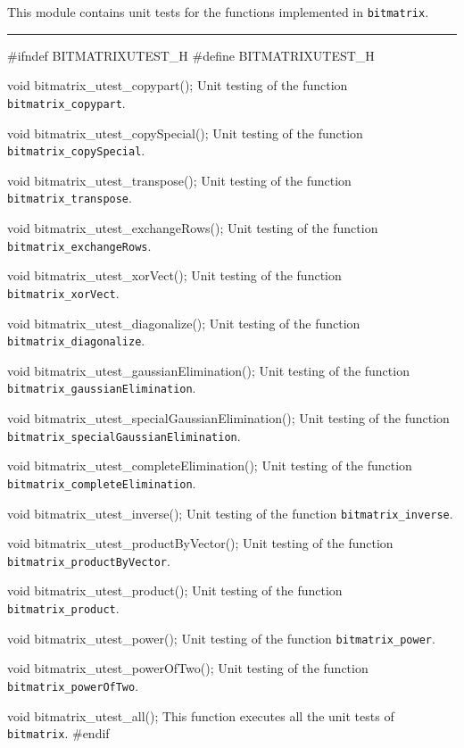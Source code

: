 
This module contains unit tests for the functions implemented in {\tt bitmatrix}. 

\bigskip
\hrule
\code
\hide
#ifndef BITMATRIXUTEST_H
#define BITMATRIXUTEST_H
\endhide
\endcode

\code
void bitmatrix_utest_copypart();
\endcode
 \tab  Unit testing of the function {\tt bitmatrix\_copypart}.
 \endtab
\code

void bitmatrix_utest_copySpecial();
\endcode
 \tab  Unit testing of the function {\tt bitmatrix\_copySpecial}.
 \endtab
\code

void bitmatrix_utest_transpose();
\endcode
 \tab  Unit testing of the function {\tt bitmatrix\_transpose}.
 \endtab
\code

void bitmatrix_utest_exchangeRows();
\endcode
 \tab  Unit testing of the function {\tt bitmatrix\_exchangeRows}.
 \endtab
\code

void bitmatrix_utest_xorVect();
\endcode
 \tab  Unit testing of the function {\tt bitmatrix\_xorVect}.
 \endtab
\code

void bitmatrix_utest_diagonalize();
\endcode
 \tab  Unit testing of the function {\tt bitmatrix\_diagonalize}.
 \endtab
\code

void bitmatrix_utest_gaussianElimination();
\endcode
 \tab  Unit testing of the function {\tt bitmatrix\_gaussianElimination}.
 \endtab
\code

void bitmatrix_utest_specialGaussianElimination();
\endcode
 \tab  Unit testing of the function {\tt bitmatrix\_specialGaussianElimination}.
 \endtab
\code

void bitmatrix_utest_completeElimination();
\endcode
 \tab  Unit testing of the function {\tt bitmatrix\_completeElimination}.
 \endtab
\code

void bitmatrix_utest_inverse();
\endcode
 \tab  Unit testing of the function {\tt bitmatrix\_inverse}.
 \endtab
\code

void bitmatrix_utest_productByVector();
\endcode
 \tab  Unit testing of the function {\tt bitmatrix\_productByVector}.
 \endtab
\code

void bitmatrix_utest_product();
\endcode
 \tab  Unit testing of the function {\tt bitmatrix\_product}.
 \endtab
\code

void bitmatrix_utest_power();
\endcode
 \tab  Unit testing of the function {\tt bitmatrix\_power}.
 \endtab
\code

void bitmatrix_utest_powerOfTwo();
\endcode
 \tab  Unit testing of the function {\tt bitmatrix\_powerOfTwo}.
 \endtab
\code

void bitmatrix_utest_all();
\endcode
 \tab  This function executes all the unit tests of {\tt bitmatrix}.
 \endtab
\code
\hide
#endif
\endhide
\endcode
